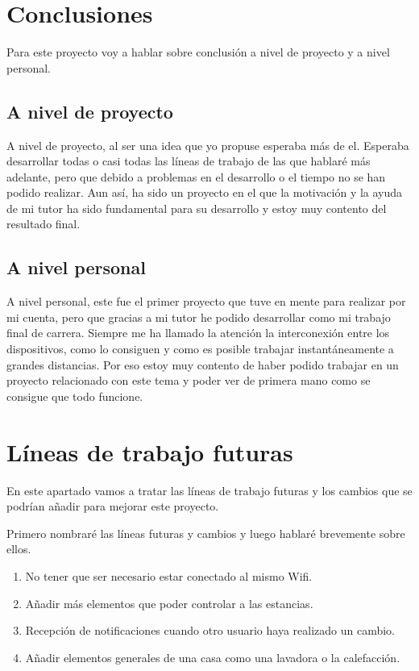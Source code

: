 
\section{Conclusiones} 

Para este proyecto voy a hablar sobre conclusión a nivel de proyecto y a nivel personal.

\subsection{A nivel de proyecto}
A nivel de proyecto, al ser una idea que yo propuse esperaba más de el. Esperaba desarrollar todas o casi todas las líneas de trabajo de las que hablaré más adelante, pero que debido a problemas en el desarrollo o el tiempo no se han podido realizar. Aun así, ha sido un proyecto en el que la motivación y la ayuda de mi tutor ha sido fundamental para su desarrollo y estoy muy contento del resultado final.

\subsection{A nivel personal}
A nivel personal, este fue el primer proyecto que tuve en mente para realizar por mi cuenta, pero que gracias a mi tutor he podido desarrollar como mi trabajo final de carrera. Siempre me ha llamado la atención la interconexión entre los dispositivos, como lo consiguen y como es posible trabajar instantáneamente a grandes distancias. Por eso estoy muy contento de haber podido trabajar en un proyecto relacionado con este tema y poder ver de primera mano como se consigue que todo funcione.

\section{Líneas de trabajo futuras}

En este apartado vamos a tratar las líneas de trabajo futuras y los cambios que se podrían añadir para mejorar este proyecto.

Primero nombraré las líneas futuras y cambios y luego hablaré brevemente sobre ellos.

\begin{enumerate}
	\item No tener que ser necesario estar conectado al mismo Wifi.
	\item Añadir más elementos que poder controlar a las estancias.
	\item Recepción de notificaciones cuando otro usuario haya realizado un cambio.
	\item Añadir elementos generales de una casa como una lavadora o la calefacción.
\end{enumerate}


